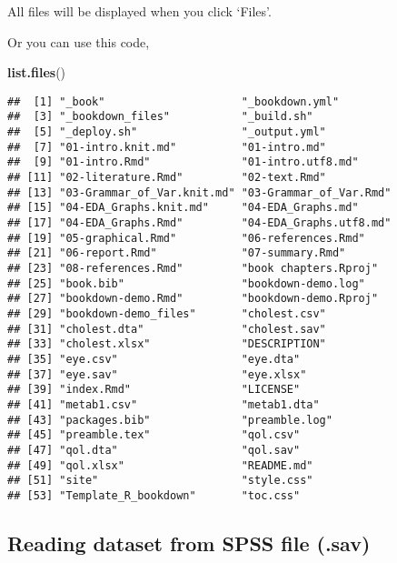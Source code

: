 \documentclass[]{book}
\newenvironment{Shaded}{\begin{snugshade}}{\end{snugshade}}
\newcommand{\KeywordTok}[1]{\textcolor[rgb]{0.13,0.29,0.53}{\textbf{#1}}}
\newcommand{\NormalTok}[1]{#1}
\theoremstyle{definition}
\theoremstyle{definition}
\theoremstyle{remark}
\begin{document}
All files will be displayed when you click `Files'.

Or you can use this code,

\begin{Shaded}
\begin{Highlighting}[]
\KeywordTok{list.files}\NormalTok{()}
\end{Highlighting}
\end{Shaded}

\begin{verbatim}
##  [1] "_book"                     "_bookdown.yml"            
##  [3] "_bookdown_files"           "_build.sh"                
##  [5] "_deploy.sh"                "_output.yml"              
##  [7] "01-intro.knit.md"          "01-intro.md"              
##  [9] "01-intro.Rmd"              "01-intro.utf8.md"         
## [11] "02-literature.Rmd"         "02-text.Rmd"              
## [13] "03-Grammar_of_Var.knit.md" "03-Grammar_of_Var.Rmd"    
## [15] "04-EDA_Graphs.knit.md"     "04-EDA_Graphs.md"         
## [17] "04-EDA_Graphs.Rmd"         "04-EDA_Graphs.utf8.md"    
## [19] "05-graphical.Rmd"          "06-references.Rmd"        
## [21] "06-report.Rmd"             "07-summary.Rmd"           
## [23] "08-references.Rmd"         "book chapters.Rproj"      
## [25] "book.bib"                  "bookdown-demo.log"        
## [27] "bookdown-demo.Rmd"         "bookdown-demo.Rproj"      
## [29] "bookdown-demo_files"       "cholest.csv"              
## [31] "cholest.dta"               "cholest.sav"              
## [33] "cholest.xlsx"              "DESCRIPTION"              
## [35] "eye.csv"                   "eye.dta"                  
## [37] "eye.sav"                   "eye.xlsx"                 
## [39] "index.Rmd"                 "LICENSE"                  
## [41] "metab1.csv"                "metab1.dta"               
## [43] "packages.bib"              "preamble.log"             
## [45] "preamble.tex"              "qol.csv"                  
## [47] "qol.dta"                   "qol.sav"                  
## [49] "qol.xlsx"                  "README.md"                
## [51] "site"                      "style.css"                
## [53] "Template_R_bookdown"       "toc.css"
\end{verbatim}

\subsection{Reading dataset from SPSS file
(.sav)}\label{reading-dataset-from-spss-file-.sav}
\end{document}
